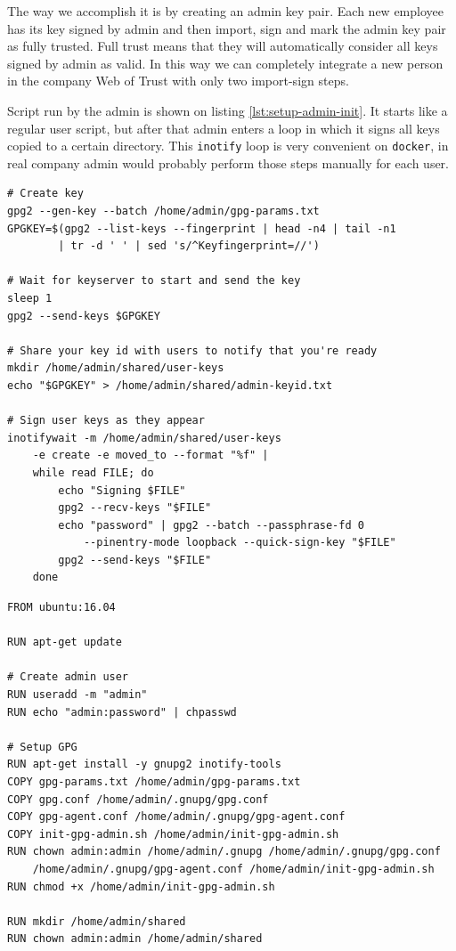 \documentclass{classrep}
\newcommand\code[1]{\texttt{#1}}
\begin{document}
The way we accomplish it is by creating an admin key pair. Each new employee
has its key signed by admin and then import, sign and mark the admin key pair as fully
trusted. Full trust means that they will automatically consider all keys
signed by admin as valid. In this way we can completely integrate a new person
in the company Web of Trust with only two import-sign steps.

Script run by the admin is shown on listing \ref{lst:setup-admin-init}.
It starts like a regular user script, but after that admin enters a loop
in which it signs all keys copied to a certain directory. This \code{inotify} loop
is very convenient on \code{docker}, in real company admin would probably perform
those steps manually for each user.

\begin{lstlisting}[label={lst:setup-admin-init}, caption={Script run by admin.}]
# Create key
gpg2 --gen-key --batch /home/admin/gpg-params.txt
GPGKEY=$(gpg2 --list-keys --fingerprint | head -n4 | tail -n1 
        | tr -d ' ' | sed 's/^Keyfingerprint=//')

# Wait for keyserver to start and send the key
sleep 1
gpg2 --send-keys $GPGKEY

# Share your key id with users to notify that you're ready
mkdir /home/admin/shared/user-keys
echo "$GPGKEY" > /home/admin/shared/admin-keyid.txt

# Sign user keys as they appear
inotifywait -m /home/admin/shared/user-keys 
    -e create -e moved_to --format "%f" |
    while read FILE; do
        echo "Signing $FILE"
        gpg2 --recv-keys "$FILE"
        echo "password" | gpg2 --batch --passphrase-fd 0 
            --pinentry-mode loopback --quick-sign-key "$FILE"
        gpg2 --send-keys "$FILE"
    done
\end{lstlisting}

\begin{lstlisting}[label={lst:setup-admin-dockerfile}, caption={Dockerfile describing admin container.}]
FROM ubuntu:16.04

RUN apt-get update 

# Create admin user
RUN useradd -m "admin"
RUN echo "admin:password" | chpasswd

# Setup GPG
RUN apt-get install -y gnupg2 inotify-tools
COPY gpg-params.txt /home/admin/gpg-params.txt
COPY gpg.conf /home/admin/.gnupg/gpg.conf
COPY gpg-agent.conf /home/admin/.gnupg/gpg-agent.conf
COPY init-gpg-admin.sh /home/admin/init-gpg-admin.sh
RUN chown admin:admin /home/admin/.gnupg /home/admin/.gnupg/gpg.conf
    /home/admin/.gnupg/gpg-agent.conf /home/admin/init-gpg-admin.sh
RUN chmod +x /home/admin/init-gpg-admin.sh

RUN mkdir /home/admin/shared
RUN chown admin:admin /home/admin/shared
\end{lstlisting}
\end{document}

